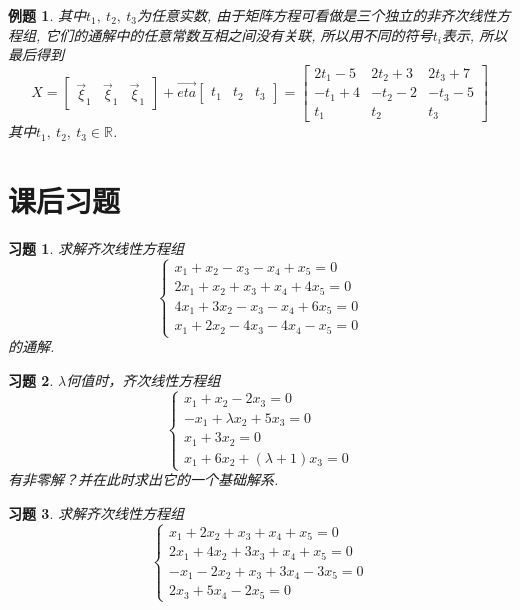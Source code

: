 \documentclass[a4paper]{book}
\newtheorem{eg}{例题}[chapter]
\newtheorem{ex}{习题}[chapter]
\begin{document}
\begin{eg}
其中$t_1,\ t_2,\ t_3$为任意实数, 由于矩阵方程可看做是三个独立的非齐次线性方程组, 它们的通解中的任意常数互相之间没有关联, 所以用不同的符号$t_i$表示, 所以最后得到
\begin{displaymath}
X=\begin{bmatrix}\vec{\xi}_1&\vec{\xi}_1&\vec{\xi}_1\end{bmatrix}+\vec{eta}\begin{bmatrix}
t_1&t_2&t_3\end{bmatrix}=\begin{bmatrix}2t_1-5&2t_2+3&2t_3+7\\-t_1+4&-t_2-2&-t_3-5\\t_1&t_2&t_3\end{bmatrix}
\end{displaymath}
其中$t_1,\ t_2,\ t_3\in\mathbb{R}$.
\end{eg}


\section{课后习题}

\begin{ex}\label{5.1}
求解齐次线性方程组\\
\begin{equation*}
\begin{cases}
x_1+x_2-x_3-x_4+x_5=0\\
2x_1+x_2+x_3+x_4+4x_5=0\\
4x_1+3x_2-x_3-x_4+6x_5=0\\
x_1+2x_2-4x_3-4x_4-x_5=0
\end{cases}
\end{equation*}
的通解.
\end{ex}

\begin{ex}\label{5.2}
$\lambda$何值时，齐次线性方程组
\begin{equation*}
\begin{cases}
x_1+x_2-2x_3=0\\
-x_1+\lambda x_2+5x_3=0\\
x_1+3x_2=0\\
x_1+6x_2+(\lambda+1) x_3=0
\end{cases}
\end{equation*}
有非零解？并在此时求出它的一个基础解系.
\end{ex}

\begin{ex}\label{5.3}
求解齐次线性方程组
\begin{equation*}
\begin{cases}
x_1+2x_2+ x_3+x_4+ x_5=0\\
2x_1+4x_2+3x_3+x_4+ x_5=0\\
-x_1-2x_2+ x_3+3x_4-3x_5=0\\
2x_3+5x_4-2x_5=0
\end{cases}
\end{equation*}
\end{ex}
\end{document}
